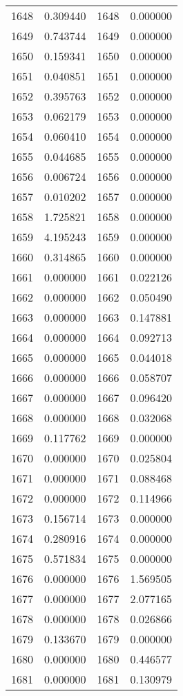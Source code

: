 \documentclass[12pt]{article}
\begin{document}
\begin{longtable}{@{}cccc@{}}
1648 & 0.309440 & 1648 & 0.000000 \\
1649 & 0.743744 & 1649 & 0.000000 \\
1650 & 0.159341 & 1650 & 0.000000 \\
1651 & 0.040851 & 1651 & 0.000000 \\
1652 & 0.395763 & 1652 & 0.000000 \\
1653 & 0.062179 & 1653 & 0.000000 \\
1654 & 0.060410 & 1654 & 0.000000 \\
1655 & 0.044685 & 1655 & 0.000000 \\
1656 & 0.006724 & 1656 & 0.000000 \\
1657 & 0.010202 & 1657 & 0.000000 \\
1658 & 1.725821 & 1658 & 0.000000 \\
1659 & 4.195243 & 1659 & 0.000000 \\
1660 & 0.314865 & 1660 & 0.000000 \\
1661 & 0.000000 & 1661 & 0.022126 \\
1662 & 0.000000 & 1662 & 0.050490 \\
1663 & 0.000000 & 1663 & 0.147881 \\
1664 & 0.000000 & 1664 & 0.092713 \\
1665 & 0.000000 & 1665 & 0.044018 \\
1666 & 0.000000 & 1666 & 0.058707 \\
1667 & 0.000000 & 1667 & 0.096420 \\
1668 & 0.000000 & 1668 & 0.032068 \\
1669 & 0.117762 & 1669 & 0.000000 \\
1670 & 0.000000 & 1670 & 0.025804 \\
1671 & 0.000000 & 1671 & 0.088468 \\
1672 & 0.000000 & 1672 & 0.114966 \\
1673 & 0.156714 & 1673 & 0.000000 \\
1674 & 0.280916 & 1674 & 0.000000 \\
1675 & 0.571834 & 1675 & 0.000000 \\
1676 & 0.000000 & 1676 & 1.569505 \\
1677 & 0.000000 & 1677 & 2.077165 \\
1678 & 0.000000 & 1678 & 0.026866 \\
1679 & 0.133670 & 1679 & 0.000000 \\
1680 & 0.000000 & 1680 & 0.446577 \\
1681 & 0.000000 & 1681 & 0.130979 \\

\end{longtable}
\end{document}

